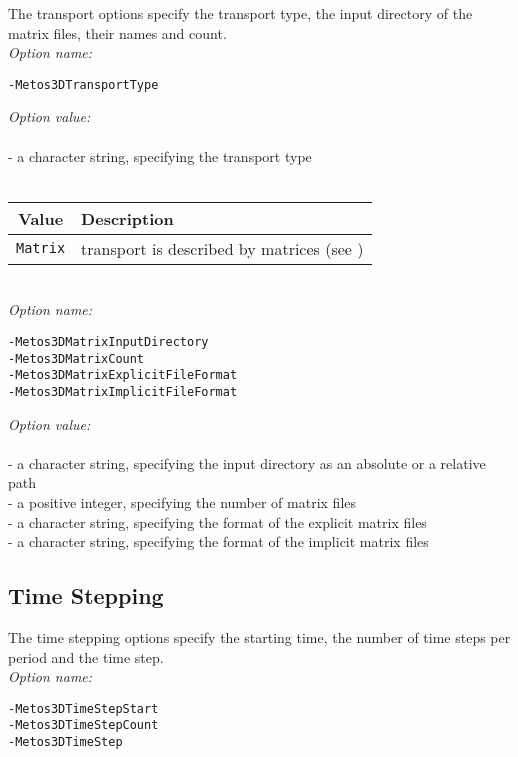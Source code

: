 \documentclass{article}
\begin{document}
The transport options specify the transport type,
the input directory of the matrix files, their names and count. \\

\emph{Option name:}
\begin{verbatim}
-Metos3DTransportType                                
\end{verbatim}

\emph{Option value:} \\
\vspace{-0.3cm}\\
- a character string, specifying the transport type \\
\\
\begin{tabular}{c|l}
Value & Description \\ \hline
\texttt{Matrix} & transport is described by matrices (see \cite{KhViCa05})
\end{tabular} \\

\emph{Option name:}
\begin{verbatim}
-Metos3DMatrixInputDirectory
-Metos3DMatrixCount
-Metos3DMatrixExplicitFileFormat
-Metos3DMatrixImplicitFileFormat
\end{verbatim}

\emph{Option value:} \\
\vspace{-0.3cm}\\
- a character string, specifying the input directory as an absolute or a relative path \\
- a positive integer, specifying the number of matrix files \\
- a character string, specifying the format of the explicit matrix files \\
- a character string, specifying the format of the implicit matrix files \\

%
%
\subsection{Time Stepping}

The time stepping options specify the starting time, the number of
time steps per period and the time step. \\

\emph{Option name:}
\begin{verbatim}
-Metos3DTimeStepStart
-Metos3DTimeStepCount
-Metos3DTimeStep
\end{verbatim}
\end{document}
